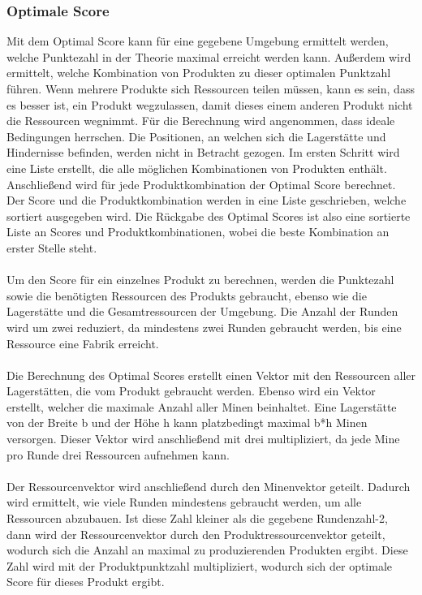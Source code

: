 \subsubsection{Optimale Score}
Mit dem Optimal Score kann für eine gegebene Umgebung ermittelt werden, welche Punktezahl in der Theorie maximal erreicht werden kann. Außerdem wird ermittelt, welche Kombination von Produkten zu dieser optimalen Punktzahl führen. Wenn mehrere Produkte sich Ressourcen teilen müssen, kann es sein, dass es besser ist, ein Produkt wegzulassen, damit dieses einem anderen Produkt nicht die Ressourcen wegnimmt. 
Für die Berechnung wird angenommen, dass ideale Bedingungen herrschen. Die Positionen, an welchen sich die Lagerstätte und Hindernisse befinden, werden nicht in Betracht gezogen. 
Im ersten Schritt wird eine Liste erstellt, die alle möglichen Kombinationen von Produkten enthält. Anschließend wird für jede Produktkombination der Optimal Score berechnet. Der Score und die Produktkombination werden in eine Liste geschrieben, welche sortiert ausgegeben wird.  Die Rückgabe des Optimal Scores ist also eine sortierte Liste an Scores und Produktkombinationen, wobei die beste Kombination an erster Stelle steht.
\\\\
Um den Score für ein einzelnes Produkt zu berechnen, werden die Punktezahl sowie die benötigten Ressourcen des Produkts gebraucht, ebenso wie die Lagerstätte und die Gesamtressourcen der Umgebung. Die Anzahl der Runden wird um zwei reduziert, da mindestens zwei Runden gebraucht werden, bis eine Ressource eine Fabrik erreicht.
\\\\
Die Berechnung des Optimal Scores erstellt einen Vektor mit den Ressourcen aller Lagerstätten, die vom Produkt gebraucht werden. Ebenso wird ein Vektor erstellt, welcher die maximale Anzahl aller Minen beinhaltet. Eine Lagerstätte von der Breite b und der Höhe h kann platzbedingt maximal b*h Minen versorgen. Dieser Vektor wird anschließend mit drei multipliziert, da jede Mine pro Runde drei Ressourcen aufnehmen kann.
\\\\
Der Ressourcenvektor wird anschließend durch den Minenvektor geteilt. Dadurch wird ermittelt, wie viele Runden mindestens gebraucht werden, um alle Ressourcen abzubauen. Ist diese Zahl kleiner als die gegebene Rundenzahl-2, dann wird der Ressourcenvektor durch den Produktressourcenvektor geteilt, wodurch sich die Anzahl an maximal zu produzierenden Produkten ergibt. Diese Zahl wird mit der Produktpunktzahl multipliziert, wodurch sich der optimale Score für dieses Produkt ergibt.

